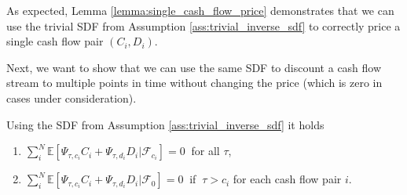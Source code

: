 As expected, Lemma \ref{lemma:single_cash_flow_price} demonstrates that we can use the trivial SDF from Assumption \ref{ass:trivial_inverse_sdf} to correctly price a single cash flow pair $(C_i, D_i)$.

Next, we want to show that we can use the same SDF to discount a cash flow stream to multiple points in time without changing the price (which is zero in cases under consideration).

\begin{proposition}
	\label{prop:zero_expectation_at_the_end}
	Using the SDF from Assumption \ref{ass:trivial_inverse_sdf} it holds
	\begin{enumerate}
		\item 
		$\sum_i^N \mathbb{E} \left[ \Psi_{\tau,c_i} C_i + \Psi_{\tau,d_i} D_i | \mathcal{F}_{c_i}  \right] = 0 \ $
		for all $\tau$,
		\item 
		$\sum_i^N \mathbb{E} \left[ \Psi_{\tau,c_i} C_i + \Psi_{\tau,d_i} D_i | \mathcal{F}_{0}  \right] = 0 \ $
		if $ \ \tau > c_i$ for each cash flow pair $i$.
	\end{enumerate}
\end{proposition}



